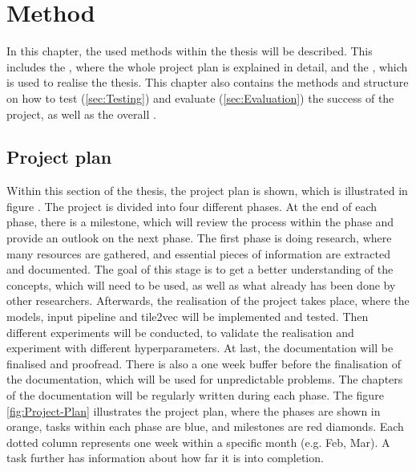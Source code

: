 \chapter{Method}
\label{ch:Method}
In this chapter, the used methods within the thesis will be described. This includes the , where the whole project plan is explained in detail, and the , which is used to realise the thesis. This chapter also contains the methods and structure on how to test (\ref{sec:Testing}) and evaluate (\ref{sec:Evaluation}) the success of the project, as well as the overall .

\section{Project plan}
\label{sec:Project-Plan}
Within this section of the thesis, the project plan is shown, which is illustrated in figure . The project is divided into four different phases. At the end of each phase, there is a milestone, which will review the process within the phase and provide an outlook on the next phase. The first phase is doing research, where many resources are gathered, and essential pieces of information are extracted and documented. The goal of this stage is to get a better understanding of the concepts, which will need to be used, as well as what already has been done by other researchers. Afterwards, the realisation of the project takes place, where the models, input pipeline and tile2vec will be implemented and tested. Then different experiments will be conducted, to validate the realisation and experiment with different hyperparameters. At last, the documentation will be finalised and proofread. There is also a one week buffer before the finalisation of the documentation, which will be used for unpredictable problems. The chapters of the documentation will be regularly written during each phase.
\newline
\newline
The figure \ref{fig:Project-Plan} illustrates the project plan, where the phases are shown in orange, tasks within each phase are blue, and milestones are red diamonds. Each dotted column represents one week within a specific month (e.g. Feb, Mar). A task further has information about how far it is into completion.

\storeareas{}
{}
\storeareas\landscapevalues

